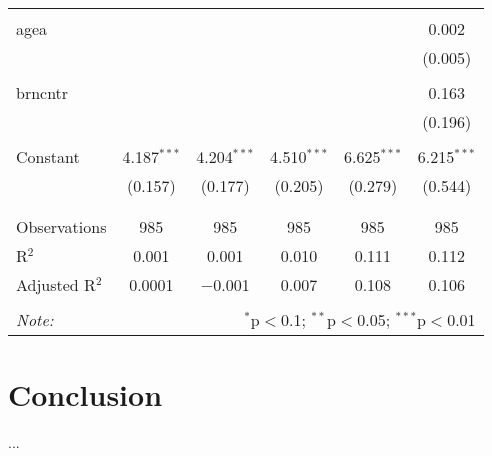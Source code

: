 \documentclass[12pt,a4paper]{article}
\begin{document}
\begin{table}[!htbp]
\begin{tabular}{@{\extracolsep{5pt}}lccccc}
		& & & & & \\ 
		agea &  &  &  &  & 0.002 \\ 
		&  &  &  &  & (0.005) \\ 
		& & & & & \\ 
		brncntr &  &  &  &  & 0.163 \\ 
		&  &  &  &  & (0.196) \\ 
		& & & & & \\ 
		Constant & 4.187$^{***}$ & 4.204$^{***}$ & 4.510$^{***}$ & 6.625$^{***}$ & 6.215$^{***}$ \\ 
		& (0.157) & (0.177) & (0.205) & (0.279) & (0.544) \\ 
		& & & & & \\ 
		\hline \\[-1.8ex] 
		Observations & 985 & 985 & 985 & 985 & 985 \\ 
		R$^{2}$ & 0.001 & 0.001 & 0.010 & 0.111 & 0.112 \\ 
		Adjusted R$^{2}$ & 0.0001 & $-$0.001 & 0.007 & 0.108 & 0.106 \\ 
		\hline 
		\hline \\[-1.8ex] 
		\textit{Note:}  & \multicolumn{5}{r}{$^{*}$p$<$0.1; $^{**}$p$<$0.05; $^{***}$p$<$0.01} \\ 
	\end{tabular} 
\end{table} 


\section{Conclusion}
...
\end{document}
